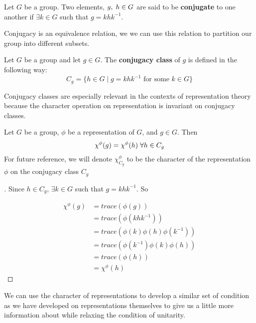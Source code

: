 \begin{definition}
	Let $G$ be a group. Two elements, $g,\hspace{1mm}h \in G$ are said to be \textbf{conjugate} to one another if $\exists k \in G$ such that $g = khk^{-1}$.
\end{definition}

Conjugacy is an equivalence relation, we we can use this relation to partition our group into different subsets.

\begin{definition}
	Let $G$ be a group and let $g \in G$. The \textbf{conjugacy class} of $g$ is defined in the following way:
$$C_g = \{h\in G \mid g = khk^{-1} \text{ for some } k \in G \}$$
\end{definition}

Conjugacy classes are especially relevant in the contexts of representation theory because the character operation on representation is invariant on conjugacy classes.

\begin{theorem}
	Let $G$ be a group, $\phi$ be a representation of $G$, and $g\in G$. Then 
$$\chi^\phi(g) = \chi^\phi(h) \hspace{1mm}\forall h \in C_g$$
For future reference, we will denote $\chi^\phi_{C_g}$ to be the character of the representation $\phi$ on the conjugacy class $C_g$
\end{theorem}
\begin{proof}[\cite{Mendes}] Since $h\in C_g$, $\exists k\in G$ such that $g = khk^{-1}$. So 

\begin{equation}
	\begin{aligned}
		\chi^\phi(g) &= trace(\phi(g)) \\
					&= trace(\phi(khk^{-1}))\\ 
					&= trace(\phi(k)\phi(h)\phi(k^{-1})) \\
					&= trace(\phi(k^{-1})\phi(k)\phi(h)) \\
					&= trace(\phi(h)) \\
					&= \chi^\phi(h) 
	\end{aligned}
\end{equation}
\end{proof}

We can use the character of representations to develop a similar set of condition as we have developed on representations themselves to give us a little more information about while relaxing the condition of unitarity.

